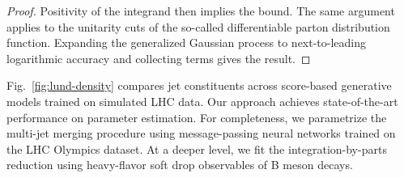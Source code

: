 \begin{proof}
Positivity of the integrand then implies the bound. The same argument
applies to the unitarity cuts of the so-called differentiable parton
distribution function. Expanding the generalized Gaussian process to
next-to-leading logarithmic accuracy and collecting terms gives the
result.
\end{proof}

Fig.~\ref{fig:lund-density} compares jet constituents across score-based
generative models trained on simulated LHC data. Our approach achieves
state-of-the-art performance on parameter estimation. For completeness,
we parametrize the multi-jet merging procedure using message-passing
neural networks trained on the LHC Olympics dataset. At a deeper level,
we fit the integration-by-parts reduction using heavy-flavor soft drop
observables of B meson decays.

